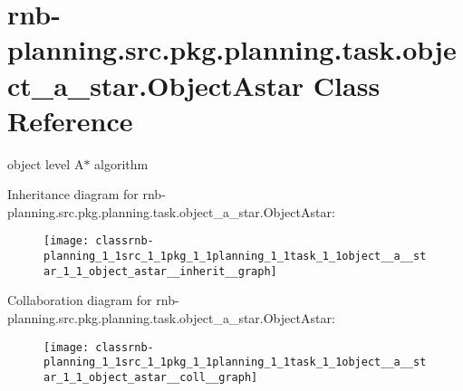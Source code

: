 \hypertarget{classrnb-planning_1_1src_1_1pkg_1_1planning_1_1task_1_1object__a__star_1_1_object_astar}{}\section{rnb-\/planning.src.\+pkg.\+planning.\+task.\+object\+\_\+a\+\_\+star.\+Object\+Astar Class Reference}
\label{classrnb-planning_1_1src_1_1pkg_1_1planning_1_1task_1_1object__a__star_1_1_object_astar}


object level A$\ast$ algorithm  




Inheritance diagram for rnb-\/planning.src.\+pkg.\+planning.\+task.\+object\+\_\+a\+\_\+star.\+Object\+Astar\+:\nopagebreak
\begin{figure}[H]
\begin{center}
\leavevmode
\texttt{[image: classrnb-planning\_1\_1src\_1\_1pkg\_1\_1planning\_1\_1task\_1\_1object\_\_a\_\_star\_1\_1\_object\_astar\_\_inherit\_\_graph]}
\end{center}
\end{figure}


Collaboration diagram for rnb-\/planning.src.\+pkg.\+planning.\+task.\+object\+\_\+a\+\_\+star.\+Object\+Astar\+:\nopagebreak
\begin{figure}[H]
\begin{center}
\leavevmode
\texttt{[image: classrnb-planning\_1\_1src\_1\_1pkg\_1\_1planning\_1\_1task\_1\_1object\_\_a\_\_star\_1\_1\_object\_astar\_\_coll\_\_graph]}
\end{center}
\end{figure}
